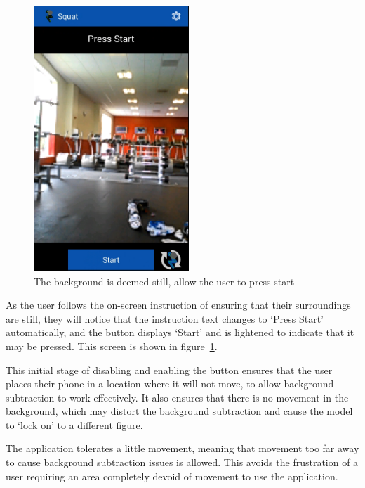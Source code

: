 \begin{figure}[H]
    \centering
	\includegraphics[height=10cm]{application/images/pressstart}
\caption{The background is deemed still, allow the user to press start}
\label{fig:pressstart}
\end{figure}

As the user follows the on-screen instruction of ensuring that their surroundings are still, they will notice that the instruction text changes to `Press Start' automatically, and the button displays `Start' and is lightened to indicate that it may be pressed. This screen is shown in figure~\ref{fig:pressstart}.

This initial stage of disabling and enabling the button ensures that the user places their phone in a location where it will not move, to allow background subtraction to work effectively. It also ensures that there is no movement in the background, which may distort the background subtraction and cause the model to `lock on' to a different figure.

The application tolerates a little movement, meaning that movement too far away to cause background subtraction issues is allowed. This avoids the frustration of a user requiring an area completely devoid of movement to use the application.

